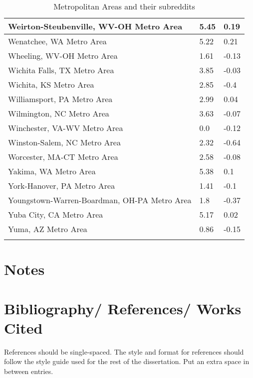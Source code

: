 \documentclass[12pt,oneside, letterpaper]{book}
\begin{document}
\begin{longtable}{| p{} | p{} | p{} |}
    Weirton-Steubenville, WV-OH Metro Area & 5.45 & 0.19 \\ \hline
    Wenatchee, WA Metro Area & 5.22 & 0.21 \\ \hline
    Wheeling, WV-OH Metro Area & 1.61 & -0.13 \\ \hline
    Wichita Falls, TX Metro Area & 3.85 & -0.03 \\ \hline
    Wichita, KS Metro Area & 2.85 & -0.4 \\ \hline
    Williamsport, PA Metro Area & 2.99 & 0.04 \\ \hline
    Wilmington, NC Metro Area & 3.63 & -0.07 \\ \hline
    Winchester, VA-WV Metro Area & 0.0 & -0.12 \\ \hline
    Winston-Salem, NC Metro Area & 2.32 & -0.64 \\ \hline
    Worcester, MA-CT Metro Area & 2.58 & -0.08 \\ \hline
    Yakima, WA Metro Area & 5.38 & 0.1 \\ \hline
    York-Hanover, PA Metro Area & 1.41 & -0.1 \\ \hline
    Youngstown-Warren-Boardman, OH-PA Metro Area & 1.8 & -0.37 \\ \hline
    Yuba City, CA Metro Area & 5.17 & 0.02 \\ \hline
    Yuma, AZ Metro Area & 0.86 & -0.15 \\ \hline
    \caption{Metropolitan Areas and their subreddits}
	\label{table:app-a}
\end{longtable}


\newpage
\chapter*{Notes}

\newpage
{}
\chapter*{Bibliography/ References/ Works Cited}
\fontsize{10}{10pt} \selectfont
References should be single-spaced. The style and format for references should follow the style guide used for the rest of the dissertation. \newline \newline
Put an extra space in between entries.

\end{document}
